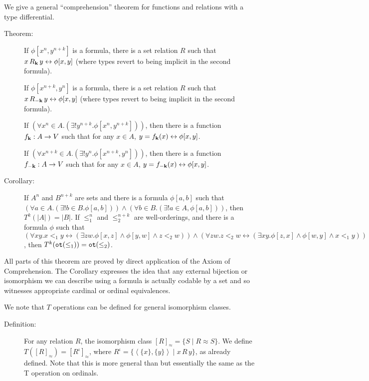 \documentclass[12pt]{book}
\begin{document}
We give a general ``comprehension'' theorem for functions and relations
with a type differential.

\begin{description}

\item[Theorem:] If $\phi[x^n,y^{n+k}]$ is a formula, there is a set
relation $R$ such that $x \,R_{\bf k}\, y \leftrightarrow \phi[x,y]$ (where
types revert to being implicit in the second formula).

 If $\phi[x^{n+k},y^{n}]$ is a formula, there is a set
relation $R$ such that $x \,R_{\bf -k}\, y \leftrightarrow \phi[x,y]$ (where
types revert to being implicit in the second formula).

If $(\forall x^{n}\in A.(\exists!y^{n+k}.\phi[x^n,y^{n+k}]))$,
then there is a function $f_{\bf k}:A \rightarrow V$ such that
for any $x \in A$, $y = f_{\bf k}(x) \leftrightarrow \phi[x,y]$.

If $(\forall x^{n+k}\in A.(\exists!y^{n}.\phi[x^{n+k},y^{n}]))$,
then there is a function $f_{\bf -k}:A \rightarrow V$ such that
for any $x \in A$, $y = f_{\bf -k}(x) \leftrightarrow \phi[x,y]$.

\item[Corollary:] If $A^n$ and $B^{n+k}$ are sets and there is a
formula $\phi[a,b]$ such that $(\forall a \in A.(\exists!b \in
B.\phi[a,b])) \wedge (\forall b \in B.(\exists!a \in A,\phi[a,b]))$,
then $T^k(|A|) = |B|$.  If $\leq_1^n$ and $\leq_2^{n+k}$ are
well-orderings, and there is a formula $\phi$ such that $(\forall xy.x
<_1 y \leftrightarrow (\exists zw.\phi[x,z]\wedge \phi[y,w]\wedge z<_2 w))
\wedge (\forall zw.z <_2 w \leftrightarrow (\exists xy.\phi[z,x]\wedge
\phi[w,y]\wedge x<_1 y))$, then $T^k({\tt ot}(\leq_1)) = {\tt
ot}(\leq_2)$.

\end{description}


All parts of this theorem are proved by direct application of the
Axiom of Comprehension.  The Corollary expresses the idea that any
external bijection or isomorphism we can describe using a formula is
actually codable by a set and so witnesses appropriate cardinal or
ordinal equivalences.

We note that $T$ operations can be defined for general isomorphism
classes.

\begin{description}

\item[Definition:] For any relation $R$, the isomorphism class
$[R]_{\approx} = \{S \mid R \approx S\}$.  We define $T([R]_{\approx})
= [R^{\iota}]_{\approx}$, where $R^{\iota} =
\{\left<\{x\},\{y\}\right>\mid x \,R\,y\}$, as already defined.  Note
that this is more general than but essentially the same as the T
operation on ordinals.

\end{description}
\end{document}
